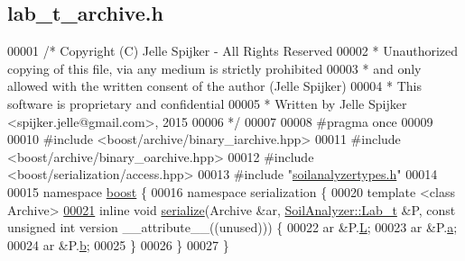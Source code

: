 \hypertarget{lab__t__archive_8h_source}{}\subsection{lab\+\_\+t\+\_\+archive.\+h}
\label{lab__t__archive_8h_source}

\begin{DoxyCode}
00001 \textcolor{comment}{/* Copyright (C) Jelle Spijker - All Rights Reserved}
00002 \textcolor{comment}{ * Unauthorized copying of this file, via any medium is strictly prohibited}
00003 \textcolor{comment}{ * and only allowed with the written consent of the author (Jelle Spijker)}
00004 \textcolor{comment}{ * This software is proprietary and confidential}
00005 \textcolor{comment}{ * Written by Jelle Spijker <spijker.jelle@gmail.com>, 2015}
00006 \textcolor{comment}{ */}
00007 
00008 \textcolor{preprocessor}{#pragma once}
00009 
00010 \textcolor{preprocessor}{#include <boost/archive/binary\_iarchive.hpp>}
00011 \textcolor{preprocessor}{#include <boost/archive/binary\_oarchive.hpp>}
00012 \textcolor{preprocessor}{#include <boost/serialization/access.hpp>}
00013 \textcolor{preprocessor}{#include "\hyperlink{soilanalyzertypes_8h}{soilanalyzertypes.h}"}
00014 
00015 \textcolor{keyword}{namespace }\hyperlink{namespaceboost}{boost} \{
00016 \textcolor{keyword}{namespace }serialization \{
00020 \textcolor{keyword}{template} <\textcolor{keyword}{class} Archive>
\hypertarget{lab__t__archive_8h_source_l00021}{}\hyperlink{namespaceboost_1_1serialization_aa5c14ec0d506df58739d30387cc0e6ec}{00021} \textcolor{keyword}{inline} \textcolor{keywordtype}{void} \hyperlink{namespaceboost_1_1serialization_acf3ecd0fdaa3726a2332e266a4ecfe47}{serialize}(Archive &ar, \hyperlink{struct_soil_analyzer_1_1_lab__t}{SoilAnalyzer::Lab\_t} &P, \textcolor{keyword}{const} \textcolor{keywordtype}{unsigned} \textcolor{keywordtype}{int} 
      version \_\_attribute\_\_((unused))) \{
00022   ar &P.\hyperlink{struct_soil_analyzer_1_1_lab__t_a95bd9662f683628a0ead6760bc194eaa}{L};
00023   ar &P.\hyperlink{struct_soil_analyzer_1_1_lab__t_a2a956821f27c87aba8939183629f2782}{a};
00024   ar &P.\hyperlink{struct_soil_analyzer_1_1_lab__t_ad703ecdb0a8024e21f8e2ae3c21d9ef2}{b};
00025 \}
00026 \}
00027 \}
\end{DoxyCode}

